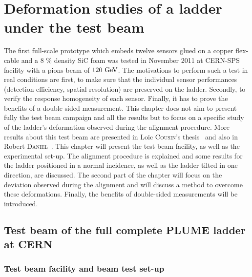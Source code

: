 \chapter{Deformation studies of a ladder under the test beam}
\label{chap:deformation}

  The first full-scale prototype which embeds twelve sensors glued on a copper flex-cable and a 8 \% density \gls{SiC} foam was tested in November 2011 at \gls{CERN}-\gls{SPS} facility with a pions beam of $120~\rm{GeV}$.
  The motivations to perform such a test in real conditions are first, to make sure that the individual sensor performances (detection efficiency, spatial resolution) are preserved on the ladder.
  Secondly, to verify the response homogeneity of each sensor.
  Finally, it has to prove the benefits of a double sided measurement.
  This chapter does not aim to present fully the test beam campaign and all the results but to focus on a specific study of the ladder's deformation observed during the alignment procedure.
  More results about this test beam are presented in Loic \textsc{Cousin}'s thesis~\cite{cousin} and also in Robert \textsc{Daniel}~\cite{maria}.
  This chapter will present the test beam facility, as well as the experimental set-up.
  The alignment procedure is explained and some results for the ladder positioned in a normal incidence, as well as the ladder tilted in one direction, are discussed.
  The second part of the chapter will focus on the deviation observed during the alignment and will discuss a method to overcome these deformations.
  Finally, the benefits of double-sided measurements will be introduced.
  
  \minitoc

  \section{Test beam of the full complete PLUME ladder at CERN}

    \subsection{Test beam facility and beam test set-up}

